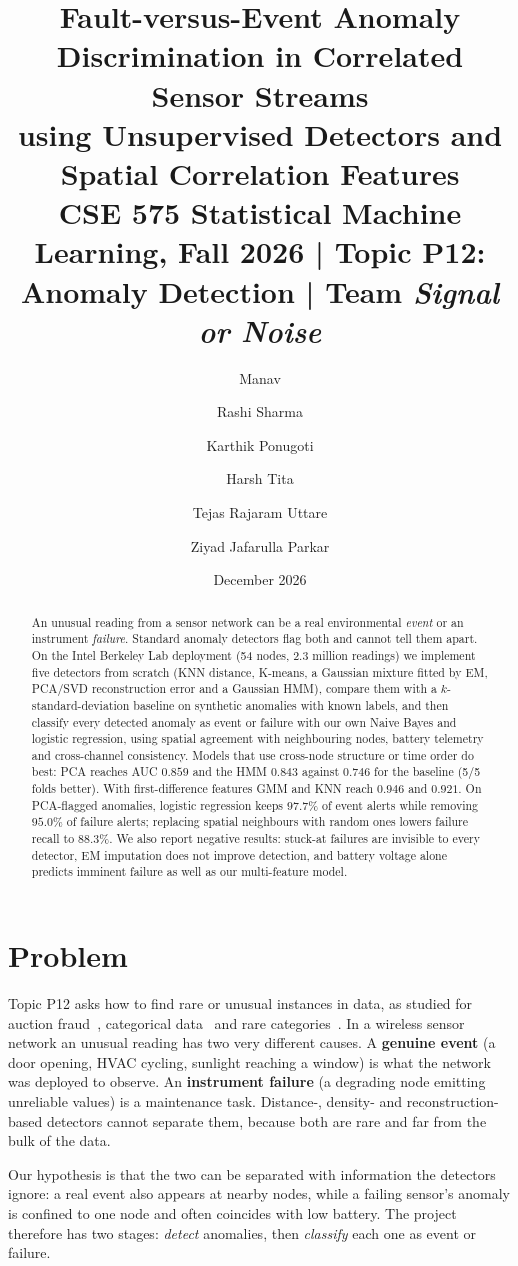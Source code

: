 \documentclass[11pt]{article}
\title{\textbf{Fault-versus-Event Anomaly Discrimination in Correlated Sensor Streams\\using Unsupervised Detectors and Spatial Correlation Features}\\[4pt]
\large CSE 575 Statistical Machine Learning, Fall 2026 \;|\; Topic P12: Anomaly Detection \;|\; Team \emph{Signal or Noise}}
\author{Manav \and Rashi Sharma \and Karthik Ponugoti \and Harsh Tita \and Tejas Rajaram Uttare \and Ziyad Jafarulla Parkar}
\date{December 2026}
\begin{document}
\maketitle

\begin{abstract}
An unusual reading from a sensor network can be a real environmental \emph{event} or an instrument \emph{failure}. Standard anomaly detectors flag both and cannot tell them apart. On the Intel Berkeley Lab deployment (54 nodes, 2.3 million readings) we implement five detectors from scratch (KNN distance, K-means, a Gaussian mixture fitted by EM, PCA/SVD reconstruction error and a Gaussian HMM), compare them with a $k$-standard-deviation baseline on synthetic anomalies with known labels, and then classify every detected anomaly as event or failure with our own Naive Bayes and logistic regression, using spatial agreement with neighbouring nodes, battery telemetry and cross-channel consistency. Models that use cross-node structure or time order do best: PCA reaches AUC $0.859$ and the HMM $0.843$ against $0.746$ for the baseline (5/5 folds better). With first-difference features GMM and KNN reach $0.946$ and $0.921$. On PCA-flagged anomalies, logistic regression keeps $97.7\%$ of event alerts while removing $95.0\%$ of failure alerts; replacing spatial neighbours with random ones lowers failure recall to $88.3\%$. We also report negative results: stuck-at failures are invisible to every detector, EM imputation does not improve detection, and battery voltage alone predicts imminent failure as well as our multi-feature model.
\end{abstract}

\section{Problem}
Topic P12 asks how to find rare or unusual instances in data, as studied for auction fraud~\cite{netprobe}, categorical data~\cite{akoglu} and rare categories~\cite{he}. In a wireless sensor network an unusual reading has two very different causes. A \textbf{genuine event} (a door opening, HVAC cycling, sunlight reaching a window) is what the network was deployed to observe. An \textbf{instrument failure} (a degrading node emitting unreliable values) is a maintenance task. Distance-, density- and reconstruction-based detectors cannot separate them, because both are rare and far from the bulk of the data.

Our hypothesis is that the two can be separated with information the detectors ignore: a real event also appears at nearby nodes, while a failing sensor's anomaly is confined to one node and often coincides with low battery. The project therefore has two stages: \emph{detect} anomalies, then \emph{classify} each one as event or failure.
\end{document}
